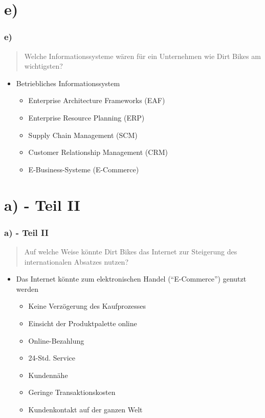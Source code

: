 \documentclass{beamer}
\begin{document}
\section{e)}
\begin{frame}
\frametitle{e)}

\begin{quote}
Welche Informationssysteme wären für ein Unternehmen wie Dirt Bikes am wichtigsten?
\end{quote}

\begin{itemize}
\item Betriebliches Informationssystem
\begin{itemize}
\setlength{\itemsep}{10pt}
\item Enterprise Architecture Frameworks (EAF)
\item Enterprise Resource Planning (ERP)
\item Supply Chain Management (SCM)
\item Customer Relationship Management (CRM)
\item E-Business-Systeme (E-Commerce)
\end{itemize}
\end{itemize}

\end{frame}

\section{a) - Teil II}
\begin{frame}
\frametitle{a) - Teil II}

\begin{quote}
Auf welche Weise k\"onnte Dirt Bikes das Internet zur Steigerung des internationalen Absatzes nutzen?
\end{quote}

\begin{itemize}
\item Das Internet k\"onnte zum elektronischen Handel (``E-Commerce'') genutzt werden
\begin{itemize}
\setlength{\itemsep}{8pt}
\item Keine Verz\"ogerung des Kaufprozesses
\item Einsicht der Produktpalette online
\item Online-Bezahlung
\item 24-Std. Service
\item Kundenn\"ahe
\item Geringe Transaktionskosten
\item Kundenkontakt auf der ganzen Welt
\end{itemize}
\end{itemize}

\end{frame}
\end{document}
